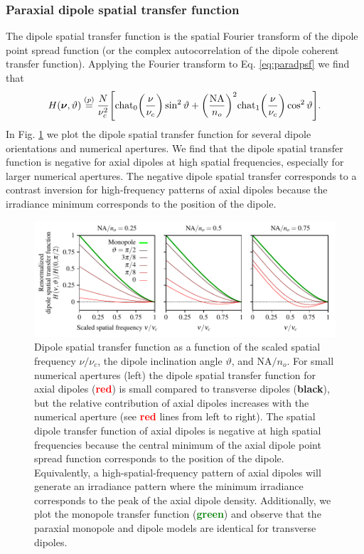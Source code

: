 \documentclass[]{osa-article}
\let\originalleft\left
\let\originalright\right
\renewcommand{\left}{\mathopen{}\mathclose\bgroup\originalleft}
\renewcommand{\right}{\aftergroup\egroup\originalright}
\providecommand{\bs}[1]{\boldsymbol{#1}}
\begin{document}
\subsubsection{Paraxial dipole spatial transfer function}\label{sec:trans}
The dipole spatial transfer function is the spatial Fourier transform of
the dipole point spread function (or the complex autocorrelation of the dipole
coherent transfer function). Applying the Fourier transform to Eq.
\eqref{eq:paradpsf} we find that
  \begin{align}
    H(\bs{\nu}, \vartheta) \stackrel{(p)}{=} \frac{N}{\nu_c^2}\left[\text{chat}_0\left(\frac{\nu}{\nu_c}\right)\sin^2\vartheta + \left(\frac{\text{NA}}{n_o}\right)^2 \text{chat}_1\left(\frac{\nu}{\nu_c}\right)\cos^2\vartheta\right].
  \end{align}
In Fig. \ref{fig:odotf} we plot the dipole spatial transfer function for
several dipole orientations and numerical apertures. We find that the dipole
spatial transfer function is negative for axial dipoles at high spatial
frequencies, especially for larger numerical apertures. The negative dipole
spatial transfer corresponds to a contrast inversion for high-frequency
patterns of axial dipoles because the irradiance minimum corresponds to the
position of the dipole.

\begin{figure}[h]
 \centering
   \centering
   \includegraphics[scale=0.8]{../figures/paratfs/sdtf.pdf}
   \caption{Dipole spatial transfer function as a function of the scaled spatial
     frequency $\nu/\nu_c$, the dipole inclination angle $\vartheta$, and
     $\text{NA}/n_o$. For small numerical apertures (left) the dipole spatial
     transfer function for axial dipoles (\textcolor{red}{\textbf{red}}) is
     small compared to transverse dipoles (\textbf{black}), but the relative
     contribution of axial dipoles increases with the numerical aperture (see
     \textcolor{red}{\textbf{red}} lines from left to right). The spatial dipole
     transfer function of axial dipoles is negative at high spatial frequencies
     because the central minimum of the axial dipole point spread function
     corresponds to the position of the dipole. Equivalently, a
     high-spatial-frequency pattern of axial dipoles will generate an irradiance
     pattern where the minimum irradiance corresponds to the peak of the axial
     dipole density. Additionally, we plot the monopole transfer function
     (\textcolor{green}{\textbf{green}}) and observe that the paraxial monopole
     and dipole models are identical for transverse dipoles.}
   \label{fig:odotf}
 \end{figure}
\end{document}
